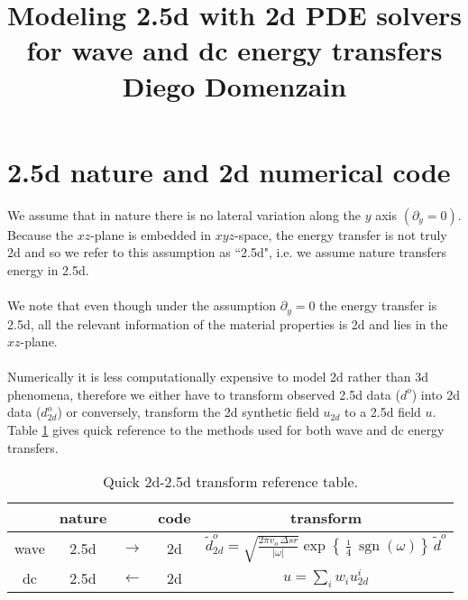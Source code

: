 \documentclass[a4paper,12pt]{article}
\title{Modeling 2.5d with 2d PDE solvers\\{\normalsize for wave and dc energy transfers}\\{\normalsize Diego Domenzain}}
\author{}
\date{}
\begin{document}
\maketitle
\section*{2.5d nature and 2d numerical code}
We assume that in nature there is no lateral variation along the $y$ axis $(\partial_y=0)$. Because the $xz$-plane is embedded in $xyz$-space, the energy transfer is not truly 2d and so we refer to this assumption as ``2.5d", i.e. we assume nature transfers energy in 2.5d.
\\\\
We note that even though under the assumption $\partial_y=0$ the energy transfer is 2.5d, all the relevant information of the material properties is 2d and lies in the $xz$-plane.
\\\\
Numerically it is less computationally expensive to model 2d rather than 3d phenomena, therefore we either have to transform observed 2.5d data ($d^o$) into 2d data ($d_{2d}^o$) or conversely, transform the 2d synthetic field $u_{2d}$ to a 2.5d field $u$. Table \ref{tbl:2d25d} gives quick reference to the methods used for both wave and dc energy transfers.
\begin{table}[!h]
\begin{tabular}{ c | c c c | c }
  & nature &  & code & transform \\
  \hline
wave & 2.5d & $\to$ & 2d & $\tilde{d}_{2d}^o = \sqrt{ \frac{2\pi v_o\,\Delta sr}{|\omega|} }
\exp\left\{{\frac{\imath}{4} \operatorname{sgn} (\omega)}\right\}\,\tilde{d}^o$ \\
 dc & 2.5d& $\gets$ & 2d & $u=\sum_i w_i u_{2d}^i$ \\
\end{tabular}
\caption{Quick 2d-2.5d transform reference table.}
 \label{tbl:2d25d}
\end{table}
\end{document}
